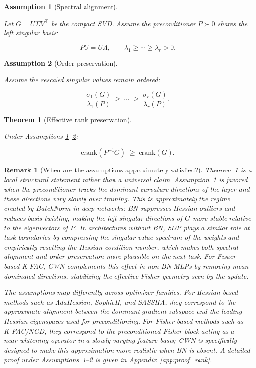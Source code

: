 \documentclass{article}
\newtheorem{theorem}{Theorem}
\newtheorem{remark}{Remark}
\newtheorem{assumption}{Assumption}
\newcommand{\erank}{\mathrm{erank}}
\begin{document}
\begin{assumption}[Spectral alignment]
\label{ass:align}

Let $G = U\Sigma V^\top$ be the compact SVD. Assume the
preconditioner $P \succ 0$ shares the left singular basis:

\[
PU = U\Lambda,
\qquad
\lambda_1 \ge \cdots \ge \lambda_r > 0.
\]

\end{assumption}

\begin{assumption}[Order preservation]
\label{ass:order}

Assume the rescaled singular values remain ordered:

\[
\frac{\sigma_1(G)}{\lambda_1(P)}
\;\ge\;
\cdots
\;\ge\;
\frac{\sigma_r(G)}{\lambda_r(P)}.
\]

\end{assumption}

\begin{theorem}[Effective rank preservation]
\label{thm:rank}

Under Assumptions \ref{ass:align}--\ref{ass:order}:

\[
\erank(P^{-1}G)
\;\ge\;
\erank(G).
\]

\end{theorem}

\begin{remark}[When are the assumptions approximately satisfied?]
\label{rem:rank_assumptions_empirical}
Theorem~\ref{thm:rank} is a local structural statement rather than a universal claim. Assumption~\ref{ass:align} is favored when the preconditioner tracks the dominant curvature directions of the layer and these directions vary slowly over training. This is approximately the regime created by BatchNorm in deep networks: BN suppresses Hessian outliers and reduces basis twisting, making the left singular directions of $G$ more stable relative to the eigenvectors of $P$. In architectures without BN, SDP plays a similar role at task boundaries by compressing the singular-value spectrum of the weights and empirically resetting the Hessian condition number, which makes both spectral alignment and order preservation more plausible on the next task. For Fisher-based K-FAC, CWN complements this effect in non-BN MLPs by removing mean-dominated directions, stabilizing the effective Fisher geometry seen by the update.

The assumptions map differently across optimizer families. For Hessian-based methods such as AdaHessian, SophiaH, and SASSHA, they correspond to the approximate alignment between the dominant gradient subspace and the leading Hessian eigenspaces used for preconditioning. For Fisher-based methods such as K-FAC/NGD, they correspond to the preconditioned Fisher block acting as a near-whitening operator in a slowly varying feature basis; CWN is specifically designed to make this approximation more realistic when BN is absent. A detailed proof under Assumptions~\ref{ass:align}--\ref{ass:order} is given in Appendix~\ref{app:proof_rank}.
\end{remark}
\end{document}
